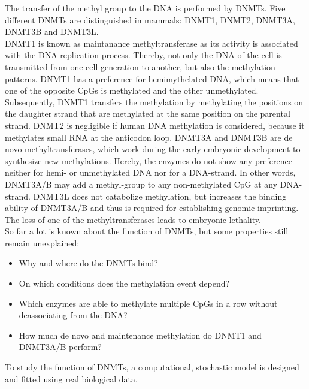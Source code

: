 The transfer of the methyl group to the DNA is performed by \acp{DNMT}. Five different \acp{DNMT} are distinguished in mammals: DNMT1, DNMT2, DNMT3A, DNMT3B and DNMT3L.\cite{DNAMethylation}\\
DNMT1 is known as maintanance methyltransferase as its activity is associated with the DNA replication process. Thereby, not only the DNA of the cell is transmitted from one cell generation to another, but also the methylation patterns. DNMT1 has a preference for hemimythelated DNA, which means that one of the opposite \acp{CpG} is methylated and the other unmethylated. Subsequently, DNMT1 transfers the methylation by methylating the positions on the daughter strand that are methylated at the same position on the parental strand.\cite{DNAMethylation}\newline
DNMT2 is negligible if human DNA methylation is considered, because it methylates small RNA at the anticodon loop.\cite{DNMT2}\newline
DNMT3A and DNMT3B are de novo methyltransferases, which work during the early embryonic development to synthesize new methylations. Hereby, the enzymes do not show any preference neither for hemi- or unmethylated DNA nor for a DNA-strand. In other words, DNMT3A/B may add a methyl-group to any non-methylated \ac{CpG} at any DNA-strand. DNMT3L does not catabolize methylation, but increases the binding ability of DNMT3A/B and thus is required for establishing genomic imprinting.\cite{DNAMethylation}\newline
The loss of one of the methyltransferases leads to embryonic lethality.\cite{DNAMethylation}\\

So far a lot is known about the function of \acp{DNMT}, but some properties still remain unexplained:
\begin{itemize}
\item Why and where do the \acp{DNMT} bind?
\item On which conditions does the methylation event depend?
\item Which enzymes are able to methylate multiple \acp{CpG} in a row without deassociating from the DNA?
\item How much de novo and maintenance methylation do DNMT1 and DNMT3A/B perform?
\end{itemize}

To study the function of \acp{DNMT}, a computational, stochastic model is designed and fitted using real biological data.\\

